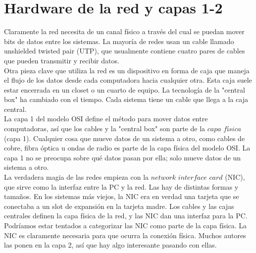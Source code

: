 \documentclass[12pt]{report}
\begin{document}
\section{Hardware de la red y capas 1-2}
Claramente la red necesita de un canal físico a través del cual se puedan 
mover bits de datos entre los sistemas. La mayoría de redes usan un cable
llamado unshielded twisted pair (UTP), que usualmente contiene cuatro pares 
de cables que pueden transmitir y recibir datos.\\
Otra pieza clave que utiliza la red es un dispositivo en forma de caja que 
maneja el flujo de los datos desde cada computadora hacia cualquier otra.
Esta caja suele estar encerrada en un closet o un cuarto de equipo.
La tecnología de la "central box" ha cambiado con el tiempo. Cada sistema 
tiene un cable que llega a la caja central.\\
La capa 1 del modelo OSI define el método para mover datos entre computadoras,
así que los cables y la "central box" son parte de la $\textit{capa física}$
(capa 1). Cualquier cosa que mueve datos de un sistema a otro, como
cables de cobre, fibra óptica u ondas de radio es parte de la capa física del
modelo OSI. La capa 1 no se preocupa sobre qué datos pasan por ella; solo mueve 
datos de un sistema a otro.\\
La verdadera magia de las redes empieza con la $\textit{network interface card}$
(NIC), que sirve como la interfaz entre la PC y la red. Las hay de distintas formas
y tamaños. En los sistemas más viejos, la NIC era en verdad una tarjeta 
que se conectaba a un slot de expansión en la tarjeta madre.
Los cables y las cajas centrales definen la capa física de la red, y las 
NIC dan una interfaz para la PC.
Podríamos estar tentados a categorizar las NIC como parte de la capa física. 
La NIC es claramente necesaria para que ocurra la conexión física. Muchos autores 
las ponen en la capa 2, así que hay algo interesante pasando con ellas.
\end{document}
